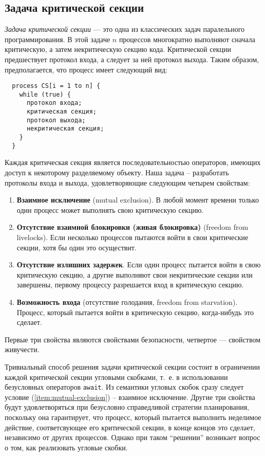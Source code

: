 \subsection{Задача критической секции}

\emph{Задача критической секции} --- это одна из классических задач паралельного
программирования. В этой задаче $n$ процессов многократно выполняют сначала
критическую, а затем некритическую секцию кода. Критической секции предшествует
протокол входа, а следует за ней протокол выхода. Таким образом, предполагается,
что процесс имеет следующий вид:

\begin{lstlisting}
  process CS[i = 1 to n] {
    while (true) {
      протокол входа;
      критическая секция;
      протокол выхода;
      некритическая секция;
    }
  }
\end{lstlisting}

Каждая критическая секция является последовательностью операторов, имеющих
доступ к некоторому разделяемому объекту. Наша задача -- разработать протоколы
входа и выхода, удовлетворяющие следующим четырем свойствам:
\begin{enumerate}[(1)]
  \item \label{item:mutual-exclusion} \textbf{Взаимное исключение} (mutual
    exclusion). В любой момент времени только один процесс может выполнять свою
    критическую секцию.
  \item \label{item:livelocks-freedom} \textbf{Отсутствие взаимной блокировки
    (живая блокировка)} (freedom from livelocks). Если несколько процессов
    пытаются войти в свои критические секции, хотя бы один это осуществит.
  \item \label{item:delays-freedom} \textbf{Отсутствие излишних задержек}. Если
    один процесс пытается войти в свою критическую секцию, а другие выполняют
    свои некритические секции или завершены, первому процессу разрешается вход в
    критическую секцию.
  \item \label{item:starvation-freedom} \textbf{Возможность входа} (отсутствие
    голодания, freedom from starvation). Процесс, который пытается войти в
    критическую секцию, когда-нибудь это сделает.
\end{enumerate}

Первые три свойства являются свойствами безопасности, четвертое --- свойством
живучести.

Тривиальный способ решения задачи критической секции состоит в ограничении
каждой критической секции угловыми скобками, т.~е. в использовании безусловных
операторов \texttt{await}. Из семантики угловых скобок сразу следует условие
(\ref{item:mutual-exclusion}) -- взаимное исключение. Другие три свойства будут
удовлетворяться при безусловно справедливой стратегии планирования, поскольку
она гарантирует, что процесс, который пытается выполнить неделимое действие,
соответсвующее его критической секции, в конце концов это сделает, независимо от
других процессов. Однако при таком ``решении'' возникает вопрос о том, как
реализовать угловые скобки.


